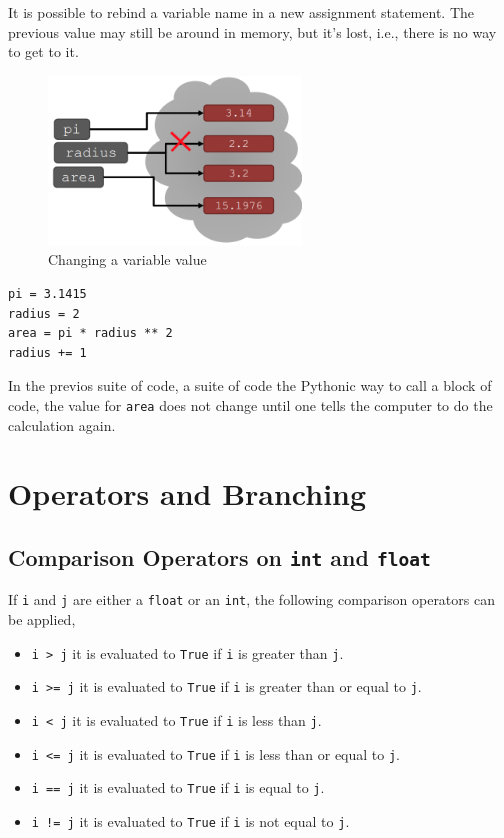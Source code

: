 \documentclass[a4paper]{article}
\newcommand{\inlinecode}{\texttt}
\begin{document}
It is possible to rebind a variable name in a new assignment statement. The
previous value may still be around in memory, but it's lost, i.e., there is
no way to get to it.

\begin{figure}[h!]
  \centering
  \includegraphics[width=0.6\textwidth]{binding.png}
  \caption{Changing a variable value}
\end{figure}

\begin{lstlisting}
pi = 3.1415
radius = 2
area = pi * radius ** 2
radius += 1
\end{lstlisting}

In the previos suite of code, a suite of code the Pythonic way to call a block
of code, the value for \inlinecode{area} does not change until one tells the
computer to do the calculation again.

\section{Operators and Branching}

\subsection{Comparison Operators on \inlinecode{int} and \inlinecode{float}}

If \inlinecode{i} and \inlinecode{j} are either a \inlinecode{float} or an
\inlinecode{int}, the following comparison operators can be applied,

\begin{itemize}
  \item \inlinecode{i > j} it is evaluated to \inlinecode{True} if
        \inlinecode{i} is greater than \inlinecode{j}.
  \item \inlinecode{i >= j} it is evaluated to \inlinecode{True} if
        \inlinecode{i} is greater than or equal to \inlinecode{j}.
  \item \inlinecode{i < j} it is evaluated to \inlinecode{True} if
        \inlinecode{i} is less than \inlinecode{j}.
  \item \inlinecode{i <= j} it is evaluated to \inlinecode{True} if
        \inlinecode{i} is less than or equal to \inlinecode{j}.
  \item \inlinecode{i == j} it is evaluated to \inlinecode{True} if
        \inlinecode{i} is equal to \inlinecode{j}.
  \item \inlinecode{i != j} it is evaluated to \inlinecode{True} if
        \inlinecode{i} is not equal to \inlinecode{j}.
\end{itemize}
\end{document}
